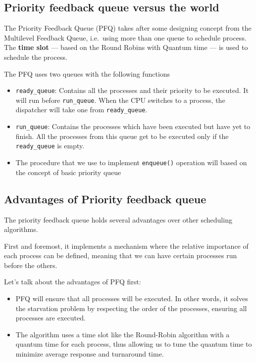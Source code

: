 \documentclass[a4paper]{article}
\numberwithin{equation}{section}
\begin{document}
\subsection{Priority feedback queue versus the world}
The Priority Feedback Queue (PFQ) takes after some designing concept from the Multilevel Feedback Queue, i.e.\ using more than one queue to schedule process.
The \textbf{time slot} --- based on the Round Robins with Quantum time --- is used to schedule the process.

The PFQ uses two queues with the following functions
\begin{itemize}
  \item \texttt{ready_queue}: Contains all the processes and their priority to be executed.
        It will run before \texttt{run_queue}.
        When the CPU switches to a process, the dispatcher will take one from \texttt{ready_queue}.

  \item \texttt{run_queue}: Contains the processes which have been executed but have yet to finish.
        All the processes from this queue get to be executed only if the \texttt{ready_queue} is empty.

  \item The procedure that we use to implement \texttt{enqueue()} operation will based on the concept of basic priority queue
\end{itemize}

\subsection{Advantages of Priority feedback queue}
The priority feedback queue holds several advantages over other scheduling algorithms.

First and foremost, it implements a mechanism where the relative importance of each process can be defined, meaning that we can have certain processes run before the others.

Let's talk about the advantages of PFQ first:
\begin{itemize}
  \item PFQ will ensure that all processes will be executed.
        In other words, it solves the starvation problem by respecting the order of the processes, ensuring all processes are executed.
  \item The algorithm uses a time slot like the Round-Robin algorithm with a quantum time for each process, thus allowing us to tune the quantum time to minimize average response and turnaround time.
\end{itemize}
\end{document}

